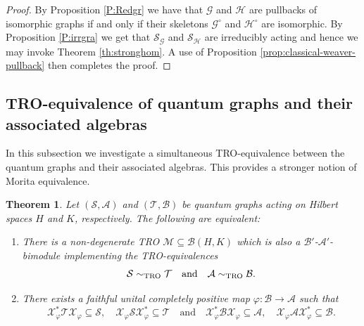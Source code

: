 \documentclass[11pt]{amsart}
\numberwithin{equation}{section}
\theoremstyle{plain}
\newtheorem{theorem}{Theorem}[section]
\theoremstyle{definition}
\theoremstyle{remark}
\newcommand{\A}{{\mathcal{A}}}
\newcommand{\B}{{\mathcal{B}}}
\newcommand{\G}{{\mathcal{G}}}
\renewcommand{\H}{{\mathcal{H}}}
\newcommand{\M}{{\mathcal{M}}}
\renewcommand{\S}{{\mathcal{S}}}
\newcommand{\T}{{\mathcal{T}}}
\newcommand{\X}{{\mathcal{X}}}
\newcommand\vphi{\varphi}
\newcommand{\qand}{\quad\text{and}\quad}
\begin{document}
\begin{proof}
By Proposition \ref{P:Redgr} we have that $\G$ and $\H$ are pullbacks of isomorphic graphs if and only if their skeletons $\G^\circ$ and $\H^\circ$ are isomorphic. By Proposition \ref{P:irrgra} we get that $\S_\G$ and $\S_\H$ are irreducibly acting and hence we may invoke Theorem \ref{th:stronghom}. A use of Proposition \ref{prop:classical-weaver-pullback} then completes the proof.
\end{proof}

\subsection{TRO-equivalence of quantum graphs and their associated algebras}
In this subsection we investigate a simultaneous TRO-equivalence between the quantum graphs and their associated algebras. This provides a stronger notion of Morita equivalence.

\begin{theorem}\label{T:qgraphs_balanced}
Let $(\S,\A)$ and $(\T,\B)$ be quantum graphs acting on Hilbert spaces $H$ and $K$, respectively. The following are equivalent:
\begin{enumerate}
\item There is a non-degenerate TRO $\M\subseteq \B(H,K)$ which is also a $\B'$-$\A'$-bimodule implementing the TRO-equivalences
\[
\S \sim_{\rm TRO } \T \qand \A \sim_{\rm TRO } \B.
\]

\item There exists a faithful unital completely positive map $\vphi\colon\B\to \A$ such that
\[
\X_\vphi^*\T \X_\vphi\subseteq \S,\quad \X_\vphi \S \X_\vphi^*\subseteq \T 
\qand
\X_\vphi^*\B \X_\vphi\subseteq \A,\quad \X_\vphi \A \X_\vphi^*\subseteq \B.
\]
\end{enumerate}
\end{theorem}
\end{document}
